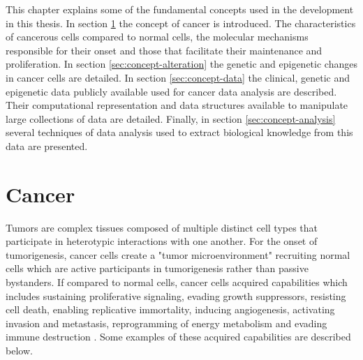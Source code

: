This chapter explains some of the fundamental concepts used in the development in this thesis.
In section \ref{sec:concept-cancer} the concept of cancer is introduced. The characteristics of cancerous cells compared to normal cells, the molecular mechanisms responsible for their onset and those that facilitate their maintenance and proliferation.
In section \ref{sec:concept-alteration} the genetic and epigenetic changes in cancer cells are detailed.
In section \ref{sec:concept-data} the clinical, genetic and epigenetic data publicly available used for cancer data analysis are described. Their computational representation and data structures available to manipulate large collections of data are detailed.
Finally, in section \ref{sec:concept-analysis} several techniques of data analysis
used to extract biological knowledge from this data are presented.


\section{Cancer} \label{sec:concept-cancer}

Tumors are complex tissues composed of multiple distinct cell types that participate in heterotypic interactions with one another. For the onset of tumorigenesis,  cancer cells create a "tumor microenvironment"
 recruiting normal cells which are active participants in tumorigenesis rather than passive bystanders.
If compared to normal cells, cancer cells acquired capabilities which includes sustaining proliferative signaling,
 evading growth suppressors, resisting cell death, enabling replicative immortality,
 inducing angiogenesis, activating invasion and metastasis, reprogramming of energy metabolism and
 evading immune destruction \cite{hanahan2011hallmarks}.  Some examples of these acquired capabilities are described below.

